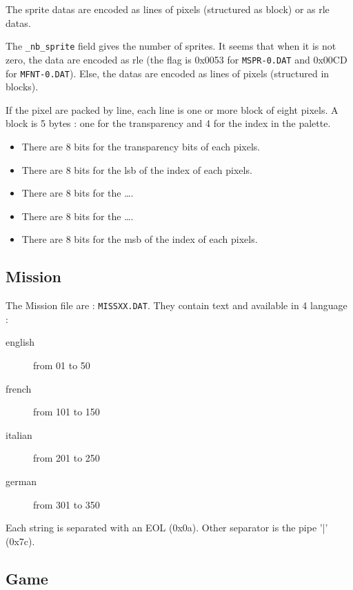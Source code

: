 \documentclass[a4paper,twoside,12pt,dvips]{article}
\begin{document}
The sprite datas are encoded as lines of pixels (structured as block) or as rle datas.

The \texttt{\_nb\_sprite} field gives the number of sprites. It seems that when it is not zero, the data are encoded as rle (the flag is 0x0053 for \texttt{MSPR-0.DAT} and 0x00CD for \texttt{MFNT-0.DAT}). Else, the datas are encoded as lines of pixels (structured in blocks).

If the pixel are packed by line,  each line is one or more block of eight pixels. A block is 5 bytes : one for the transparency and 4 for the index in the palette.
\begin{itemize}
\item There are 8 bits for the transparency bits of each pixels.
\item There are 8 bits for the lsb of the index of each pixels.
\item There are 8 bits for the \dots.
\item There are 8 bits for the \dots.
\item There are 8 bits for the msb of the index of each pixels.
\end{itemize}


\subsection{Mission}
\label{sec:mission}

The Mission file are : \texttt{MISSXX.DAT}. They contain text and available in 4 language :
\begin{description}
\item[english] from 01 to 50
\item[french] from 101 to 150
\item[italian] from 201 to 250
\item[german]  from 301 to 350
\end{description}

Each string is separated with an EOL (0x0a). Other separator is the pipe '|' (0x7c). 

\subsection{Game}
\label{sec:game}
\end{document}
